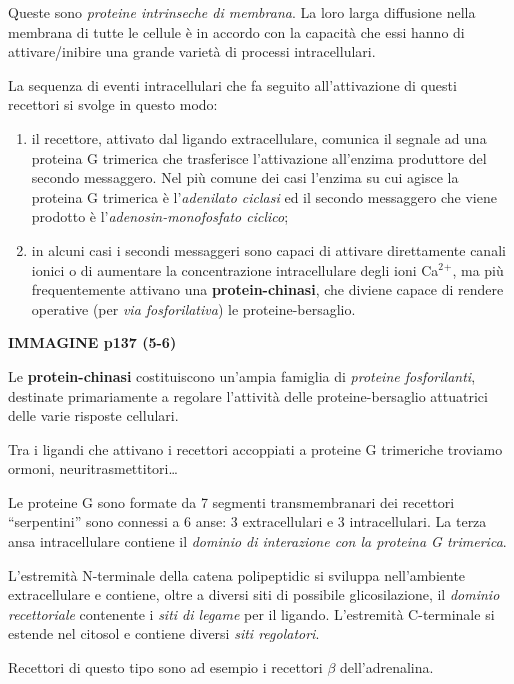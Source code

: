 \documentclass[]{article}
\begin{document}
Queste sono \emph{proteine intrinseche di membrana}. La loro larga
diffusione nella membrana di tutte le cellule è in accordo con la
capacità che essi hanno di attivare/inibire una grande varietà di
processi intracellulari.

La sequenza di eventi intracellulari che fa seguito all'attivazione di
questi recettori si svolge in questo modo:

\begin{enumerate}
\def\labelenumi{\arabic{enumi}.}
\itemsep1pt\parskip0pt
\item
  il recettore, attivato dal ligando extracellulare, comunica il segnale
  ad una proteina G trimerica che trasferisce l'attivazione all'enzima
  produttore del secondo messaggero. Nel più comune dei casi l'enzima su
  cui agisce la proteina G trimerica è l'\emph{adenilato ciclasi} ed il
  secondo messaggero che viene prodotto è l'\emph{adenosin-monofosfato
  ciclico};
\item
  in alcuni casi i secondi messaggeri sono capaci di attivare
  direttamente canali ionici o di aumentare la concentrazione
  intracellulare degli ioni Ca\(^2\)\(^+\), ma più frequentemente
  attivano una \textbf{protein-chinasi}, che diviene capace di rendere
  operative (per \emph{via fosforilativa}) le proteine-bersaglio.
\end{enumerate}

\textbf{IMMAGINE p137 (5-6)}

Le \textbf{protein-chinasi} costituiscono un'ampia famiglia di
\emph{proteine fosforilanti}, destinate primariamente a regolare
l'attività delle proteine-bersaglio attuatrici delle varie risposte
cellulari.

Tra i ligandi che attivano i recettori accoppiati a proteine G
trimeriche troviamo ormoni, neuritrasmettitori\ldots{}

Le proteine G sono formate da 7 segmenti transmembranari dei recettori
``serpentini'' sono connessi a 6 anse: 3 extracellulari e 3
intracellulari. La terza ansa intracellulare contiene il \emph{dominio
di interazione con la proteina G trimerica}.

L'estremità N-terminale della catena polipeptidic si sviluppa
nell'ambiente extracellulare e contiene, oltre a diversi siti di
possibile glicosilazione, il \emph{dominio recettoriale} contenente i
\emph{siti di legame} per il ligando. L'estremità C-terminale si estende
nel citosol e contiene diversi \emph{siti regolatori}.

Recettori di questo tipo sono ad esempio i recettori \(\beta\)
dell'adrenalina.
\end{document}
